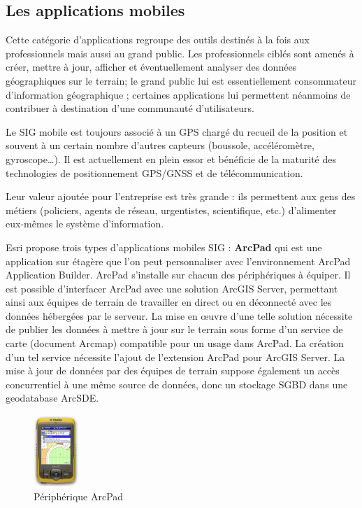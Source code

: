 \documentclass[11pt]{article}
\begin{document}
\subsection{Les applications mobiles}
Cette catégorie d’applications regroupe des outils destinés à la fois aux professionnels mais aussi au grand public. Les professionnels ciblés sont amenés à  créer, mettre à jour, afficher et éventuellement analyser des données géographiques sur le terrain; le grand public lui est essentiellement consommateur d’information géographique ; certaines applications lui permettent néanmoins de contribuer à destination d’une communauté d’utilisateurs.

Le SIG mobile est toujours associé à un GPS chargé du recueil de la position et souvent à un certain nombre d’autres capteurs (boussole, accéléromètre, gyroscope…). Il est actuellement en plein essor et bénéficie de la maturité des technologies de positionnement GPS/GNSS et de télécommunication.

Leur valeur ajoutée pour l’entreprise est très grande : ils permettent aux gens des métiers (policiers, agents de réseau, urgentistes, scientifique, etc.) d’alimenter eux-mêmes le système d’information.

Esri propose trois types d’applications mobiles SIG : 
\textbf{ArcPad} qui est une application sur étagère que l’on peut personnaliser avec l’environnement ArcPad Application Builder. ArcPad s’installe sur chacun des périphériques à équiper. Il est possible d’interfacer ArcPad avec une solution ArcGIS Server, permettant ainsi aux équipes de terrain de travailler en direct ou en déconnecté avec les données hébergées par le serveur. La mise en œuvre d’une telle solution nécessite de publier les données à mettre à jour sur le terrain sous forme d’un service de carte (document Arcmap) compatible pour un usage dans ArcPad. La création d’un tel service nécessite l’ajout de l’extension ArcPad pour ArcGIS Server. La mise à jour de données par des équipes de terrain suppose également un accès concurrentiel à une même source de données, donc un stockage SGBD dans une geodatabase ArcSDE.
\begin{figure}[H]
	\center \includegraphics[width=0.15\textwidth]{img/cours/arcpad.jpg}
	\caption{Périphérique ArcPad}
\end{figure}
	
\end{document}
